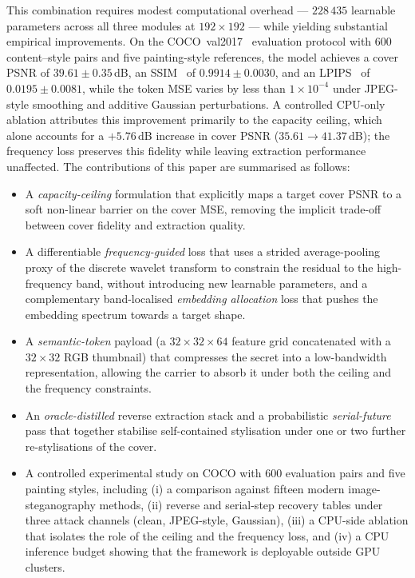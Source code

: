 \documentclass[conference]{IEEEtran}
\begin{document}
This combination requires modest computational overhead --- $228\,435$ learnable parameters across all three modules at $192\!\times\!192$ --- while yielding substantial empirical improvements. On the COCO~val2017~\cite{coco} evaluation protocol with $600$ content--style pairs and five painting-style references, the model achieves a cover PSNR of $39.61\pm0.35$\,dB, an SSIM~\cite{ssim} of $0.9914\pm0.0030$, and an LPIPS~\cite{lpips} of $0.0195\pm0.0081$, while the token MSE varies by less than $1\times10^{-4}$ under JPEG-style smoothing and additive Gaussian perturbations. A controlled CPU-only ablation attributes this improvement primarily to the capacity ceiling, which alone accounts for a $+5.76$\,dB increase in cover PSNR ($35.61\to41.37$\,dB); the frequency loss preserves this fidelity while leaving extraction performance unaffected. The contributions of this paper are summarised as follows:
\begin{itemize}
    \item A \emph{capacity-ceiling} formulation that explicitly maps a target cover PSNR to a soft non-linear barrier on the cover MSE, removing the implicit trade-off between cover fidelity and extraction quality.
    \item A differentiable \emph{frequency-guided} loss that uses a strided average-pooling proxy of the discrete wavelet transform to constrain the residual to the high-frequency band, without introducing new learnable parameters, and a complementary band-localised \emph{embedding allocation} loss that pushes the embedding spectrum towards a target shape.
    \item A \emph{semantic-token} payload (a $32\!\times\!32\!\times\!64$ feature grid concatenated with a $32\!\times\!32$ RGB thumbnail) that compresses the secret into a low-bandwidth representation, allowing the carrier to absorb it under both the ceiling and the frequency constraints.
    \item An \emph{oracle-distilled} reverse extraction stack and a probabilistic \emph{serial-future} pass that together stabilise self-contained stylisation under one or two further re-stylisations of the cover.
    \item A controlled experimental study on COCO with $600$ evaluation pairs and five painting styles, including (i) a comparison against fifteen modern image-steganography methods, (ii) reverse and serial-step recovery tables under three attack channels (clean, JPEG-style, Gaussian), (iii) a CPU-side ablation that isolates the role of the ceiling and the frequency loss, and (iv) a CPU inference budget showing that the framework is deployable outside GPU clusters.
\end{itemize}
\end{document}
